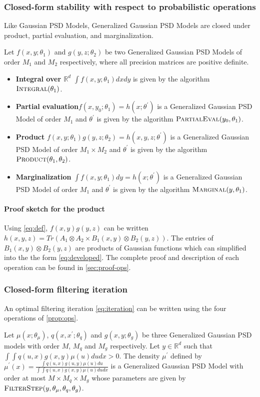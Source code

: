 \subsubsection{Closed-form stability with respect to probabilistic operations}
Like Gaussian PSD Models, Generalized Gaussian PSD Models are closed under product, partial evaluation, and marginalization.
\begin{proposition}\label{prop:ops}
    Let $f(x, y; \theta_1)$ and $g(y, z; \theta_2)$ be two Generalized Gaussian PSD Models of order $M_1$ and $M_2$ respectively, where all precision matrices are positive definite.
    \begin{itemize}
        \item\textbf{Integral over $\mathbb R^d$} $\int f(x, y; \theta_1)dxdy$ is given by the algorithm $\operatorname{\textsc{Integral}}(\theta_1)$.
        \item\textbf{Partial evaluation}$f(x, y_0; \theta_1) = h(x; \theta^\prime)$ is a Generalized Gaussian PSD Model of order $M_1$ and $\theta^\prime$ is given by the algorithm $\operatorname{\textsc{PartialEval}}(y_0, \theta_1)$.
        \item\textbf{Product} $f(x, y; \theta_1)g(y, z; \theta_2)=h(x, y, z; \theta^\prime)$ is a Generalized Gaussian PSD Model of order $M_1\times M_2$ and $\theta^\prime$ is given by the algorithm $\operatorname{\textsc{Product}}(\theta_1, \theta_2)$.
        \item\textbf{Marginalization} $\int f(x, y; \theta_1)dy=h(x; \theta^\prime)$ is a Generalized Gaussian PSD Model of order $M_1$ and $\theta^\prime$ is given by the algorithm $\operatorname{\textsc{Marginal}}(y, \theta_1)$.
    \end{itemize}
    \end{proposition}
\paragraph{Proof sketch for the product} Using \cref{eq:def}, $f(x, y)g(y, z)$ can be written $h(x, y, z) = Tr(A_1\otimes A_2 \times B_1(x, y) \otimes B_2(y, z))$. The entries of $B_1(x, y) \otimes B_2(y, z)$ are products of Gaussian functions which can simplified into the the form \cref{eq:developed}. The complete proof and description of each operation can be found in \cref{sec:proof-ops}.

\subsubsection{Closed-form filtering iteration}
An optimal filtering iteration \cref{eq:iteration} can be written using the four operations of \cref{prop:ops}.
\begin{proposition}\label{proposition:psdfilterstep}
Let $\mu(x; \theta_\mu)$, $q(x, x^\prime; \theta_q)$ and $g(x, y; \theta_g)$ be three Generalized Gaussian PSD models with order $M$, $M_q$ and $M_g$ respectively. Let $y\in\mathbb R^d$ such that $\int\int q(u, x)g(x, y)\mu(u)dudx>0$. The density $\mu^\prime$ defined by $\mu^\prime(x) = \frac{\int q(u, x)g(u, y)\mu(u)du}{\int\int q(u, x)g(x, y)\mu(u)dudx}$ is a Generalized Gaussian PSD Model with order at most $M \times M_q \times M_g$ whose parameters are given by $\operatorname{\textsc{FilterStep}}(y, \theta_\mu, \theta_q, \theta_g)$.
\end{proposition}

